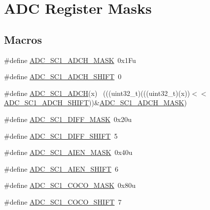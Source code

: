 \hypertarget{group___a_d_c___register___masks}{}\section{A\+DC Register Masks}
\label{group___a_d_c___register___masks}
\subsection*{Macros}
\begin{DoxyCompactItemize}
\item 
\#define \hyperlink{group___a_d_c___register___masks_ga7450ced3c2b2df20023c2152f1470640}{A\+D\+C\+\_\+\+S\+C1\+\_\+\+A\+D\+C\+H\+\_\+\+M\+A\+SK}~0x1\+Fu
\item 
\#define \hyperlink{group___a_d_c___register___masks_gab2ba46d5132224f2920c1881e2c1b6fe}{A\+D\+C\+\_\+\+S\+C1\+\_\+\+A\+D\+C\+H\+\_\+\+S\+H\+I\+FT}~0
\item 
\#define \hyperlink{group___a_d_c___register___masks_ga84ca57710a5589aed16fdd78629a1105}{A\+D\+C\+\_\+\+S\+C1\+\_\+\+A\+D\+CH}(x)                                                ~(((uint32\+\_\+t)(((uint32\+\_\+t)(x))$<$$<$\hyperlink{group___a_d_c___register___masks_gab2ba46d5132224f2920c1881e2c1b6fe}{A\+D\+C\+\_\+\+S\+C1\+\_\+\+A\+D\+C\+H\+\_\+\+S\+H\+I\+FT}))\&\hyperlink{group___a_d_c___register___masks_ga7450ced3c2b2df20023c2152f1470640}{A\+D\+C\+\_\+\+S\+C1\+\_\+\+A\+D\+C\+H\+\_\+\+M\+A\+SK})
\item 
\#define \hyperlink{group___a_d_c___register___masks_gadc514fb491cf08eb3fb0f27298388645}{A\+D\+C\+\_\+\+S\+C1\+\_\+\+D\+I\+F\+F\+\_\+\+M\+A\+SK}~0x20u
\item 
\#define \hyperlink{group___a_d_c___register___masks_ga1385c936a9440856068dcb917ed9c658}{A\+D\+C\+\_\+\+S\+C1\+\_\+\+D\+I\+F\+F\+\_\+\+S\+H\+I\+FT}~5
\item 
\#define \hyperlink{group___a_d_c___register___masks_gaa698d898e077003de10a42184de8f124}{A\+D\+C\+\_\+\+S\+C1\+\_\+\+A\+I\+E\+N\+\_\+\+M\+A\+SK}~0x40u
\item 
\#define \hyperlink{group___a_d_c___register___masks_gaf2cde8fb207dd348e6313d6d0a5b3761}{A\+D\+C\+\_\+\+S\+C1\+\_\+\+A\+I\+E\+N\+\_\+\+S\+H\+I\+FT}~6
\item 
\#define \hyperlink{group___a_d_c___register___masks_ga698a3a178a5b412febc8c0cc849e8896}{A\+D\+C\+\_\+\+S\+C1\+\_\+\+C\+O\+C\+O\+\_\+\+M\+A\+SK}~0x80u
\item 
\#define \hyperlink{group___a_d_c___register___masks_gad708b138ec734a371a20a990f0c9a27f}{A\+D\+C\+\_\+\+S\+C1\+\_\+\+C\+O\+C\+O\+\_\+\+S\+H\+I\+FT}~7
$$
\end{DoxyCompactItemize}
